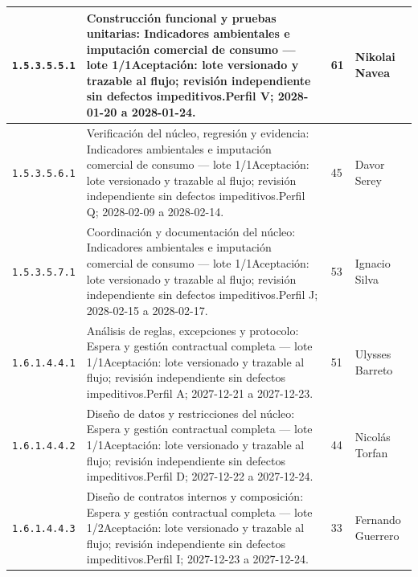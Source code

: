 \begin{longtable}{L{29mm}L{80mm}R{12mm}L{28mm}}
\texttt{1.\allowbreak{}5.\allowbreak{}3.\allowbreak{}5.\allowbreak{}5.\allowbreak{}1} & Construcción funcional y pruebas unitarias: Indicadores ambientales e imputación comercial de consumo — lote 1/1\newline Aceptación: lote versionado y trazable al flujo; revisión independiente sin defectos impeditivos.\newline Perfil V; 2028-01-20 a 2028-01-24. & 61 & Nikolai Navea\\\hline
\texttt{1.\allowbreak{}5.\allowbreak{}3.\allowbreak{}5.\allowbreak{}6.\allowbreak{}1} & Verificación del núcleo, regresión y evidencia: Indicadores ambientales e imputación comercial de consumo — lote 1/1\newline Aceptación: lote versionado y trazable al flujo; revisión independiente sin defectos impeditivos.\newline Perfil Q; 2028-02-09 a 2028-02-14. & 45 & Davor Serey\\\hline
\texttt{1.\allowbreak{}5.\allowbreak{}3.\allowbreak{}5.\allowbreak{}7.\allowbreak{}1} & Coordinación y documentación del núcleo: Indicadores ambientales e imputación comercial de consumo — lote 1/1\newline Aceptación: lote versionado y trazable al flujo; revisión independiente sin defectos impeditivos.\newline Perfil J; 2028-02-15 a 2028-02-17. & 53 & Ignacio Silva\\\hline
\texttt{1.\allowbreak{}6.\allowbreak{}1.\allowbreak{}4.\allowbreak{}4.\allowbreak{}1} & Análisis de reglas, excepciones y protocolo: Espera y gestión contractual completa — lote 1/1\newline Aceptación: lote versionado y trazable al flujo; revisión independiente sin defectos impeditivos.\newline Perfil A; 2027-12-21 a 2027-12-23. & 51 & Ulysses Barreto\\\hline
\texttt{1.\allowbreak{}6.\allowbreak{}1.\allowbreak{}4.\allowbreak{}4.\allowbreak{}2} & Diseño de datos y restricciones del núcleo: Espera y gestión contractual completa — lote 1/1\newline Aceptación: lote versionado y trazable al flujo; revisión independiente sin defectos impeditivos.\newline Perfil D; 2027-12-22 a 2027-12-24. & 44 & Nicolás Torfan\\\hline
\texttt{1.\allowbreak{}6.\allowbreak{}1.\allowbreak{}4.\allowbreak{}4.\allowbreak{}3} & Diseño de contratos internos y composición: Espera y gestión contractual completa — lote 1/2\newline Aceptación: lote versionado y trazable al flujo; revisión independiente sin defectos impeditivos.\newline Perfil I; 2027-12-23 a 2027-12-24. & 33 & Fernando Guerrero\\\hline

\end{longtable}
